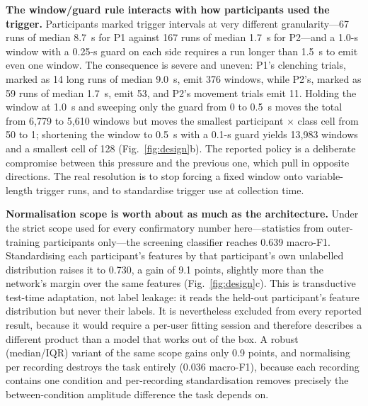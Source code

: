 \documentclass[pdflatex,sn-nature,iicol]{sn-jnl}
\begin{document}
\textbf{The window/guard rule interacts with how participants used the trigger.} Participants marked trigger intervals at very different granularity---67 runs of median 8.7~s for P1 against 167 runs of median 1.7~s for P2---and a 1.0-s window with a 0.25-s guard on each side requires a run longer than 1.5~s to emit even one window. The consequence is severe and uneven: P1's clenching trials, marked as 14 long runs of median 9.0~s, emit 376 windows, while P2's, marked as 59 runs of median 1.7~s, emit 53, and P2's movement trials emit 11. Holding the window at 1.0~s and sweeping only the guard from 0 to 0.5~s moves the total from 6,779 to 5,610 windows but moves the smallest participant $\times$ class cell from 50 to 1; shortening the window to 0.5~s with a 0.1-s guard yields 13,983 windows and a smallest cell of 128 (Fig.~\ref{fig:design}b). The reported policy is a deliberate compromise between this pressure and the previous one, which pull in opposite directions. The real resolution is to stop forcing a fixed window onto variable-length trigger runs, and to standardise trigger use at collection time.

\textbf{Normalisation scope is worth about as much as the architecture.} Under the strict scope used for every confirmatory number here---statistics from outer-training participants only---the screening classifier reaches 0.639 macro-F1. Standardising each participant's features by that participant's own unlabelled distribution raises it to 0.730, a gain of 9.1 points, slightly more than the network's margin over the same features (Fig.~\ref{fig:design}c). This is transductive test-time adaptation, not label leakage: it reads the held-out participant's feature distribution but never their labels. It is nevertheless excluded from every reported result, because it would require a per-user fitting session and therefore describes a different product than a model that works out of the box. A robust (median/IQR) variant of the same scope gains only 0.9 points, and normalising per recording destroys the task entirely (0.036 macro-F1), because each recording contains one condition and per-recording standardisation removes precisely the between-condition amplitude difference the task depends on.
\end{document}
